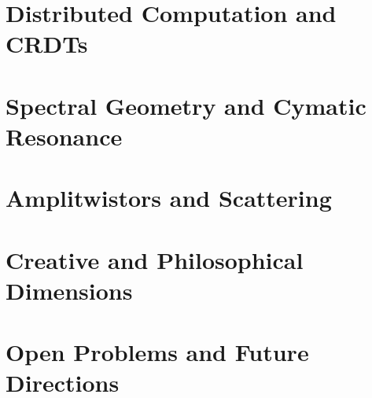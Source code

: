 \documentclass[11pt]{book}
\begin{document}
\part{Distributed Computation and CRDTs}




\part{Spectral Geometry and Cymatic Resonance}




\part{Amplitwistors and Scattering}




\part{Creative and Philosophical Dimensions}





\part{Open Problems and Future Directions}




\appendix






\backmatter
\printbibliography
\end{document}
